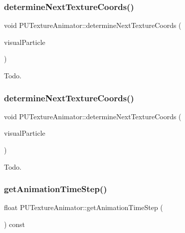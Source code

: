 \subsubsection{\texorpdfstring{determine\+Next\+Texture\+Coords()}{determineNextTextureCoords()}\hspace{0.1cm}{\footnotesize\ttfamily [1/2]}}
{\footnotesize\ttfamily void P\+U\+Texture\+Animator\+::determine\+Next\+Texture\+Coords (\begin{DoxyParamCaption}\item[{\hyperlink{structPUParticle3D}{P\+U\+Particle3D} $\ast$}]{visual\+Particle }\end{DoxyParamCaption})\hspace{0.3cm}{\ttfamily [protected]}}

Todo. \mbox{\label{classPUTextureAnimator_ac5fc99a0f3da0295beb89fb8c08440cd}} 
\subsubsection{\texorpdfstring{determine\+Next\+Texture\+Coords()}{determineNextTextureCoords()}\hspace{0.1cm}{\footnotesize\ttfamily [2/2]}}
{\footnotesize\ttfamily void P\+U\+Texture\+Animator\+::determine\+Next\+Texture\+Coords (\begin{DoxyParamCaption}\item[{\hyperlink{structPUParticle3D}{P\+U\+Particle3D} $\ast$}]{visual\+Particle }\end{DoxyParamCaption})\hspace{0.3cm}{\ttfamily [protected]}}

Todo. \mbox{\label{classPUTextureAnimator_a62c538e770b330f543cd2e9dada3b628}} 
\subsubsection{\texorpdfstring{get\+Animation\+Time\+Step()}{getAnimationTimeStep()}\hspace{0.1cm}{\footnotesize\ttfamily [1/2]}}
{\footnotesize\ttfamily float P\+U\+Texture\+Animator\+::get\+Animation\+Time\+Step (\begin{DoxyParamCaption}\item[{void}]{ }\end{DoxyParamCaption}) const}

